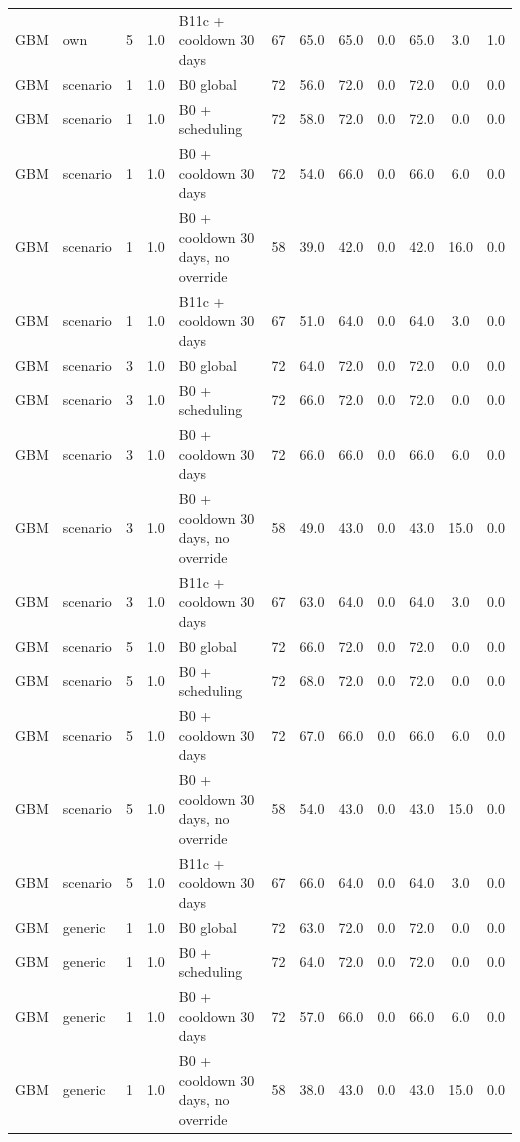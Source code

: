 \documentclass[10pt,onecolumn,letterpaper]{article}
\begin{document}
\begin{longtable}{lllllccccccc}
GBM & own & 5 & 1.0 & B11c + cooldown 30 days & 67 & 65.0 & 65.0 & 0.0 & 65.0 & 3.0 & 1.0 \\
GBM & scenario & 1 & 1.0 & B0 global & 72 & 56.0 & 72.0 & 0.0 & 72.0 & 0.0 & 0.0 \\
GBM & scenario & 1 & 1.0 & B0 + scheduling & 72 & 58.0 & 72.0 & 0.0 & 72.0 & 0.0 & 0.0 \\
GBM & scenario & 1 & 1.0 & B0 + cooldown 30 days & 72 & 54.0 & 66.0 & 0.0 & 66.0 & 6.0 & 0.0 \\
GBM & scenario & 1 & 1.0 & B0 + cooldown 30 days, no override & 58 & 39.0 & 42.0 & 0.0 & 42.0 & 16.0 & 0.0 \\
GBM & scenario & 1 & 1.0 & B11c + cooldown 30 days & 67 & 51.0 & 64.0 & 0.0 & 64.0 & 3.0 & 0.0 \\
GBM & scenario & 3 & 1.0 & B0 global & 72 & 64.0 & 72.0 & 0.0 & 72.0 & 0.0 & 0.0 \\
GBM & scenario & 3 & 1.0 & B0 + scheduling & 72 & 66.0 & 72.0 & 0.0 & 72.0 & 0.0 & 0.0 \\
GBM & scenario & 3 & 1.0 & B0 + cooldown 30 days & 72 & 66.0 & 66.0 & 0.0 & 66.0 & 6.0 & 0.0 \\
GBM & scenario & 3 & 1.0 & B0 + cooldown 30 days, no override & 58 & 49.0 & 43.0 & 0.0 & 43.0 & 15.0 & 0.0 \\
GBM & scenario & 3 & 1.0 & B11c + cooldown 30 days & 67 & 63.0 & 64.0 & 0.0 & 64.0 & 3.0 & 0.0 \\
GBM & scenario & 5 & 1.0 & B0 global & 72 & 66.0 & 72.0 & 0.0 & 72.0 & 0.0 & 0.0 \\
GBM & scenario & 5 & 1.0 & B0 + scheduling & 72 & 68.0 & 72.0 & 0.0 & 72.0 & 0.0 & 0.0 \\
GBM & scenario & 5 & 1.0 & B0 + cooldown 30 days & 72 & 67.0 & 66.0 & 0.0 & 66.0 & 6.0 & 0.0 \\
GBM & scenario & 5 & 1.0 & B0 + cooldown 30 days, no override & 58 & 54.0 & 43.0 & 0.0 & 43.0 & 15.0 & 0.0 \\
GBM & scenario & 5 & 1.0 & B11c + cooldown 30 days & 67 & 66.0 & 64.0 & 0.0 & 64.0 & 3.0 & 0.0 \\
GBM & generic & 1 & 1.0 & B0 global & 72 & 63.0 & 72.0 & 0.0 & 72.0 & 0.0 & 0.0 \\
GBM & generic & 1 & 1.0 & B0 + scheduling & 72 & 64.0 & 72.0 & 0.0 & 72.0 & 0.0 & 0.0 \\
GBM & generic & 1 & 1.0 & B0 + cooldown 30 days & 72 & 57.0 & 66.0 & 0.0 & 66.0 & 6.0 & 0.0 \\
GBM & generic & 1 & 1.0 & B0 + cooldown 30 days, no override & 58 & 38.0 & 43.0 & 0.0 & 43.0 & 15.0 & 0.0 \\

\end{longtable}
\end{document}
